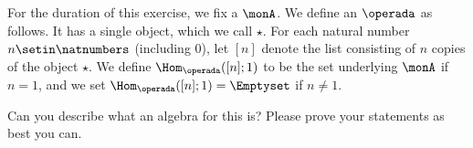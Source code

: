 \begin{gradedexercise}
    \label{ex:MonoidsActionsAsAlgebras}
    For the duration of this exercise, we fix a  $\monA$.
    We define an $\operada$ as follows.
    It has a single object, which we call $\star$.
    For each natural number $n \setin \natnumbers$ (including $0$), let $[n]$ denote the list consisting of $n$ copies of the object $\star$.
    We define $\Hom_\operada([n];1)$ to be the set underlying $\monA$ if $n =1$, and we set $\Hom_\operada([n];1) = \Emptyset$ if $n \neq 1$.

    Can you describe what an algebra for this  is?
    Please prove your statements as best you can.
\end{gradedexercise}



\showslides{
    \begin{forslides}
        \begin{equation}
            \label{eq:composition_operad}
            [\mora,\morb]\mthen \morc
        \end{equation}
    \end{forslides}

}


